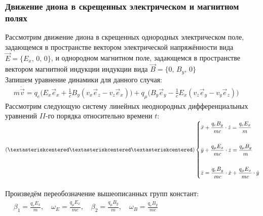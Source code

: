 \documentclass[oneside,final,14pt]{extarticle}
\begin{document}
	\newpage
	\subsubsection{Движение диона в скрещенных электрическом и магнитном полях}
	
	\noindent Рассмотрим движение диона в скрещенных однородных электрическом поле, задающемся в пространстве вектором электрической напряжённости вида $\vec{E} = \{E_{x},\, 0,\, 0\}$, и однородном магнитном поле, задающемся в пространстве вектором магнитной индукции индукции вида $\vec{B} = \{0,\, B_{y},\, 0\}$  \\
	
	\noindent Запишем уравнение динамики для данного случая: \\
	
	\begin{math}
		\begin{aligned}
			& m\dot{\vec{v}} = q_{e}\Big(E_{x}\vec{e}_{x} + \frac{1}{c}B_{y}\left(v_{x}\vec{e}_{z} - v_{z}\vec{e}_{x}\right)\Big) + q_{\mu}\Big(B_{y}\vec{e}_{y} - \frac{1}{c}E_{x}\left(v_{z}\vec{e}_{y} - v_{y}\vec{e}_{z}\right)\Big)
		\end{aligned}
	\end{math} \\
	
	\noindent Рассмотрим следующую систему линейных неоднородных дифференциальных уравнений $II$-го порядка относительно времени $t$: \\
	
	\begin{math}
		(\textasteriskcentered\textasteriskcentered\textasteriskcentered) \left\{
		\begin{aligned}
			& \ddot{x} + \frac{q_{e}B_{y}}{mc} \cdot \dot{z} = \frac{q_{e}E_{x}}{m} \\\\
			& \ddot{y} + \frac{q_{\mu}E_{x}}{mc} \cdot \dot{z} = \frac{q_{\mu}B_{y}}{m} \\\\
			& \ddot{z} = \frac{q_{e}B_{y}}{mc} \cdot \dot{x} + \frac{q_{\mu}E_{x}}{mc} \cdot \dot{y} 
		\end{aligned}
		\right.
	\end{math} \\\\
	
	\noindent Произведём переобозначение вышеописанных групп констант: \\
	
	\begin{math}
		\begin{aligned}
			& \beta_{1} = \frac{q_{e}E_{x}}{m}, \quad \omega_{E} = \frac{q_{\mu}E_{x}}{mc}, \quad \beta_{2} = \frac{q_{\mu}B_{y}}{m}, \quad \omega_{B} = \frac{q_{e}B_{y}}{mc}
		\end{aligned}
	\end{math} \\
	
\end{document}
